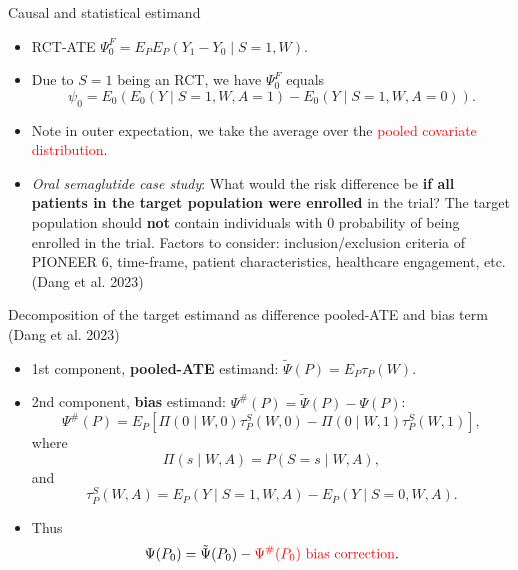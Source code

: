 \documentclass[t]{beamer}
\begin{document}
\begin{frame}{Causal and statistical estimand}
\begin{itemize}
\item RCT-ATE $\Psi^F_0 = E_PE_P(Y_1-Y_0\mid S=1,W)$.
\item Due to $S=1$ being an RCT, we have $\Psi^F_0$ equals {\small
\[ \psi_0=E_0\left( E_0(Y\mid S=1,W,A=1)-E_0(Y\mid S=1,W,A=0)\right).\]}
\item Note in  outer expectation, we take the average over the \textcolor{red}{pooled covariate distribution}. 
\item \textit{Oral semaglutide case study}: What would the risk difference be \textbf{if all patients in the target population were enrolled} in the trial? The target population should \textbf{not} contain individuals with 0 probability of being enrolled in the trial. Factors to consider: inclusion/exclusion criteria of PIONEER 6, time-frame, patient characteristics, healthcare engagement, etc. (Dang et al. 2023)
\end{itemize}
\end{frame}

\begin{frame}{Decomposition of the target estimand as difference  pooled-ATE and bias term (Dang et al. 2023)}
\begin{itemize}
\item 1st component, \textbf{pooled-ATE} estimand: $\tilde{\Psi}(P)=E_P\tau_P(W)$.
\item 2nd component, \textbf{bias} estimand: $\Psi^\#(P)=\tilde{\Psi}(P)-\Psi(P)$:
$$\Psi^\#(P)=E_P[\Pi(0\mid W,0)\tau^S_P(W,0)-\Pi(0\mid W,1)\tau^S_P(W,1)],$$
 where $$\Pi(s\mid W,A)=P(S=s\mid W,A),$$ and \[\tau_P^S(W,A)=E_P(Y\mid S=1,W,A)-E_P(Y\mid S=0,W,A).\]
\item Thus
\[ \Psi(P_0)=\tilde{\Psi}(P_0)-\textcolor{red}{\Psi^\#(P_0)} \ \text{\textcolor{red}{bias correction}}.\]
\end{itemize}
\end{frame}
\end{document}
